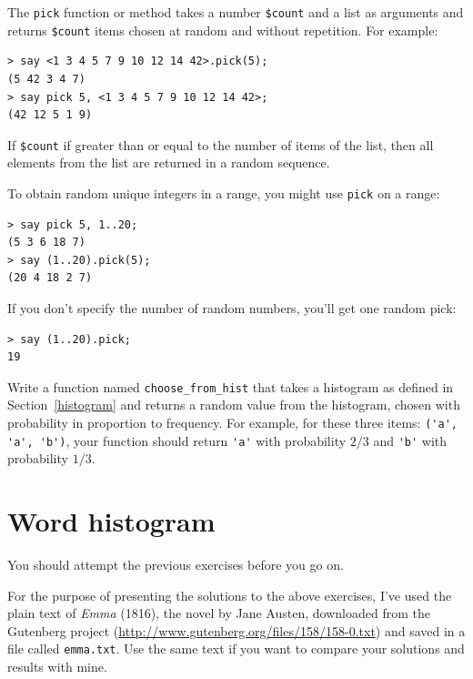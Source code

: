 The {\tt pick} function or method takes a number \verb'$count'  and a list as arguments and returns \verb'$count' items chosen at 
random and without repetition. For example:

\begin{verbatim}
> say <1 3 4 5 7 9 10 12 14 42>.pick(5);
(5 42 3 4 7)
> say pick 5, <1 3 4 5 7 9 10 12 14 42>;
(42 12 5 1 9)
\end{verbatim}

If \verb'$count' if greater than or equal to the number of 
items of the list, then all elements from the list are returned 
in a random sequence.

To obtain random unique integers in a range, you might use 
{\tt pick} on a range:

\begin{verbatim}
> say pick 5, 1..20;
(5 3 6 18 7)
> say (1..20).pick(5);
(20 4 18 2 7)
\end{verbatim}

If you don't specify the number of random numbers, you'll get one 
random pick:

\begin{verbatim}
> say (1..20).pick;
19
\end{verbatim}
%


\begin{exercise}

Write a function named \verb"choose_from_hist" that takes
a histogram as defined in Section~\ref{histogram} and returns a 
random value from the histogram, chosen with probability
in proportion to frequency.  For example, for these three 
items: \verb"('a', 'a', 'b')", your function should 
return \verb"'a'" with probability $2/3$ and \verb"'b'" 
with probability $1/3$.
\end{exercise}


\section{Word histogram}

You should attempt the previous exercises before you go on.

For the purpose of presenting the solutions to the above 
exercises, I've used the plain text of {\em Emma} (1816), the 
novel by Jane Austen, downloaded from the Gutenberg project 
(\url{http://www.gutenberg.org/files/158/158-0.txt}) and 
saved in a file called \verb'emma.txt'. Use the same 
text if you want to compare your solutions and results 
with mine.

